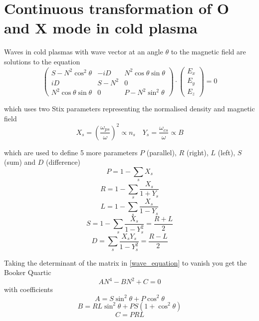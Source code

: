 \documentclass[12pt, twoside]{article}
\begin{document}
	\section{Continuous transformation of O and X mode in cold plasma}
	Waves in cold plasmas with wave vector at an angle $\theta$ to the magnetic field are solutions to the equation
	\begin{equation}\label{wave_equation}
		\begin{pmatrix}
			S-N^2 \cos^2 \theta & -iD & N^2 \cos \theta \sin \theta \\
			iD & S-N^2 & 0 \\
			N^2 \cos \theta \sin \theta & 0 & P - N^2 \sin^2 \theta
		\end{pmatrix} \cdot
		\begin{pmatrix}
			E_x \\ E_y \\ E_z
		\end{pmatrix} = 0
	\end{equation}
	
	which uses two Stix parameters representing the normalised density and magnetic field
	\begin{equation}
		X_s = \left(\frac{\omega_{ps}}{\omega}\right)^2 \propto n_s \quad Y_s =  \frac{\omega_{cs}}{\omega} \propto B
	\end{equation}

	which are used to define 5 more parameters $P$ (parallel), $R$ (right), $L$ (left), $S$ (sum) and $D$ (difference)
	\begin{equation*}
		P = 1 - \sum_s X_s
	\end{equation*}
	\begin{equation*}
		R = 1 - \sum_s \frac{X_s}{1+Y_s}
	\end{equation*}
	\begin{equation*}
		L = 1 - \sum_s \frac{X_s}{1-Y_s}
	\end{equation*}
	\begin{equation*}
		S = 1 - \sum_s \frac{X_s}{1-Y_s^2} = \frac{R + L}{2}
	\end{equation*}
	\begin{equation*}
		D = \sum_s \frac{X_sY_s}{1-Y_s^2} = \frac{R - L}{2}
	\end{equation*}

	Taking the determinant of the matrix in \eqref{wave_equation} to vanish you get the Booker Quartic
	\begin{equation}\label{booker_quartic}
		AN^4 - BN^2 + C = 0
	\end{equation}
	with coefficients
	\begin{equation*}
		A = S \sin^2 \theta + P \cos^2 \theta
	\end{equation*}
	\begin{equation*}
		B = RL\sin^2 \theta + PS \left( 1+\cos^2 \theta \right)
	\end{equation*}
	\begin{equation*}
		C = PRL
	\end{equation*}
	
\end{document}

